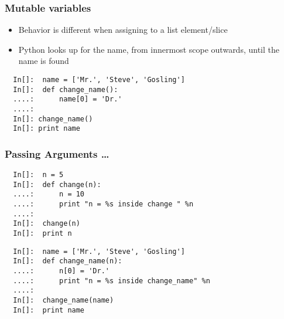 \begin{frame}[fragile]
  \frametitle{Mutable variables}
  \begin{itemize}
  \item Behavior is different when assigning to a list element/slice
  \item Python looks up for the name, from innermost scope outwards,
    until the name is found
  \end{itemize}
  \begin{lstlisting}
  In[]:  name = ['Mr.', 'Steve', 'Gosling']
  In[]:  def change_name():
  ....:      name[0] = 'Dr.'
  ....:
  In[]: change_name()
  In[]: print name
  \end{lstlisting}
\end{frame}

\begin{frame}[fragile]
  \frametitle{Passing Arguments \ldots}
  \begin{lstlisting}
  In[]:  n = 5
  In[]:  def change(n):
  ....:      n = 10
  ....:      print "n = %s inside change " %n
  ....:
  In[]:  change(n)
  In[]:  print n
  \end{lstlisting}
  
  \begin{lstlisting}
  In[]:  name = ['Mr.', 'Steve', 'Gosling']
  In[]:  def change_name(n):
  ....:      n[0] = 'Dr.'
  ....:      print "n = %s inside change_name" %n
  ....:
  In[]:  change_name(name)
  In[]:  print name
  \end{lstlisting}
\end{frame}
